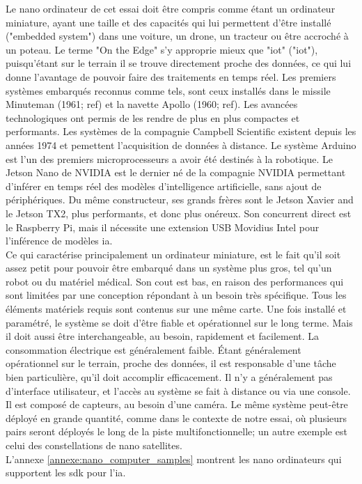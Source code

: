 ﻿\noindent Le nano ordinateur de cet essai doit être compris comme étant un ordinateur miniature, ayant une taille et des capacités qui lui permettent d'être installé ("embedded system") dans une voiture, un drone, un tracteur ou être accroché à un poteau. Le terme "On the Edge" s'y approprie mieux que "\acrshort{iot}" ("\acrlong{iot}"), puisqu'étant sur le terrain il se trouve directement proche des données, ce qui lui donne l'avantage de pouvoir faire des traitements en temps réel. Les premiers systèmes embarqués reconnus comme tels, sont ceux installés dans le missile Minuteman (1961; ref) et la navette Apollo (1960; ref). Les avancées technologiques ont permis de les rendre de plus en plus compactes et performants. Les systèmes de la compagnie Campbell Scientific existent depuis les années 1974 et pemettent l'acquisition de données à distance. Le système Arduino est l'un des premiers microprocesseurs a avoir été destinés à la robotique. Le Jetson Nano de NVIDIA est le dernier né de la compagnie NVIDIA permettant d'inférer en temps réel des modèles d'intelligence artificielle, sans ajout de périphériques. Du même constructeur, ses grands frères sont le Jetson Xavier and le Jetson TX2, plus performants, et donc plus onéreux. Son concurrent direct est le Raspberry Pi, mais il nécessite une extension USB Movidius Intel pour l'inférence de modèles \acrshort{ia}. 
\vspace{\baselineskip}
\\
\noindent Ce qui caractérise principalement un ordinateur miniature, est le fait qu'il soit assez petit pour pouvoir être embarqué dans un système plus gros, tel qu'un robot ou du matériel médical. Son cout est bas, en raison des performances qui sont limitées par une conception répondant à un besoin très spécifique. Tous les éléments matériels requis sont contenus sur une même carte.  Une fois installé et paramétré, le système se doit d'être fiable et opérationnel sur le long terme. Mais il doit aussi être interchangeable, au besoin, rapidement et facilement. La consommation électrique est généralement faible. Étant généralement opérationnel sur le terrain, proche des données, il est responsable d'une tâche bien particulière, qu'il doit accomplir efficacement. Il n'y a généralement pas d'interface utilisateur, et l'accès au système se fait à distance ou via une console. Il est composé de capteurs, au besoin d'une caméra. Le même système peut-être déployé en grande quantité, comme dans le contexte de notre essai, où plusieurs pairs seront déployés le long de la piste multifonctionnelle; un autre exemple est celui des constellations de nano satellites.
\vspace{\baselineskip}
\\
\noindent L'annexe \ref{annexe:nano_computer_samples} montrent les nano ordinateurs qui supportent les \acrshort{sdk} pour l'\acrshort{ia}.
